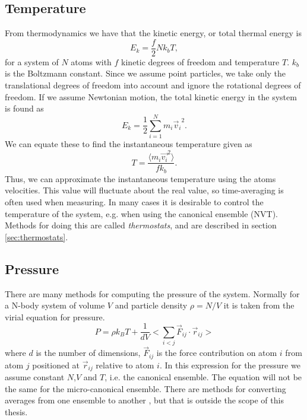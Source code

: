 \documentclass[twoside,english]{uiofysmaster}
\begin{document}
\subsection{Temperature}
From thermodynamics we have that the kinetic energy, or total thermal energy is 
\begin{equation}
E_k = \frac{f}{2} Nk_bT, 
\end{equation}
for a system of $N$ atoms with $f$ kinetic degrees of freedom and temperature $T$.  
$k_b$ is the Boltzmann constant. 
Since we assume point particles, we take only the translational degrees of freedom into account and ignore the rotational degrees of freedom.
If we assume Newtonian motion, the total kinetic energy in the system is found as
\begin{equation}
E_k = \frac{1}{2}\sum_{i=1}^{N} m_i {\vec{v}_i}^2.
\end{equation}
We can equate these to find the instantaneous temperature given as
\begin{equation}\label{eq:MDtemperature}
T = \frac{\langle m_i \vec{v_i}^2\rangle}{fk_b}.
\end{equation}
Thus, we can approximate the instantaneous temperature using the atoms velocities.
This value will fluctuate about the real value, so time-averaging is often used when measuring.
In many cases it is desirable to control the temperature of the system, e.g. when using the canonical ensemble (NVT).
Methods for doing this are called \textit{thermostats}, and are described in section \ref{sec:thermostats}.


\subsection{Pressure}
There are many methods for computing the pressure of the system. 
Normally for a N-body system of volume $V$ and particle density $\rho=N/V$ it is taken from the virial equation for pressure. 
\begin{equation}
	P = \rho k_B T + \frac{1}{dV}\Big< \sum_{i<j} \vec{F}_{ij} \cdot \vec{r}_{ij}\Big> 
\end{equation}
where $d$ is the number of dimensions, $\vec{F}_{ij}$ is the force contribution on atom $i$ from atom $j$ positioned at $\vec{r}_{ij}$ relative to atom $i$.
In this expression for the pressure we assume constant $N$,$V$ and $T$, i.e. the canonical ensemble.
The equation will not be the same for the micro-canonical ensemble.
There are methods for converting averages from one ensemble to another \cite{Lebowitz}, but that is outside the scope of this thesis.
\end{document}
